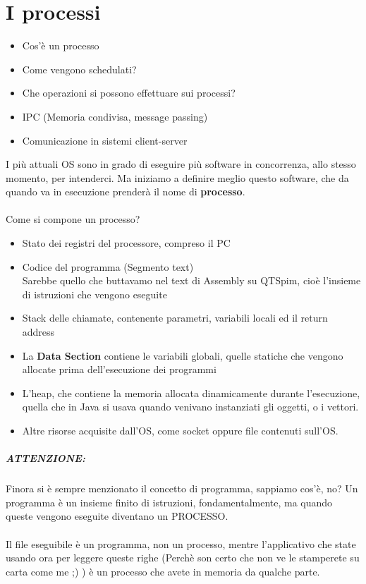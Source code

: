 \documentclass[12pt, a4paper, openany, twoside]{book}
\begin{document}
\chapter{I processi}
\begin{itemize}
	\item Cos'è un processo
	\item Come vengono schedulati?
	\item Che operazioni si possono effettuare sui processi?
	\item IPC (Memoria condivisa, message passing)
	\item Comunicazione in sistemi client-server
\end{itemize}
I più attuali OS sono in grado di eseguire più software in concorrenza, allo 
stesso momento, per intenderci. Ma iniziamo a definire meglio questo software,
che da quando va in esecuzione prenderà il nome di \textbf{processo}.
\\ \\
Come si compone un processo? 
\begin{itemize}
	\item Stato dei registri del processore, compreso il PC
	\item Codice del programma (Segmento text) \\
	Sarebbe quello che buttavamo nel text di Assembly su QTSpim, cioè 
	l'insieme di istruzioni che vengono eseguite
	\item Stack delle chiamate, contenente parametri, variabili locali ed il
	return address
	\item La \textbf{Data Section} contiene le variabili globali, quelle statiche
	che vengono allocate prima dell'esecuzione dei programmi
	\item L'heap, che contiene la memoria allocata dinamicamente durante
	l'esecuzione, quella che in Java si usava quando venivano instanziati gli
	oggetti, o i vettori.\\ 
	\item Altre risorse acquisite dall'OS, come socket oppure file contenuti sull'OS.
\end{itemize}   
\paragraph{ATTENZIONE: }
Finora si è sempre menzionato il concetto di programma, sappiamo cos'è, no? 
Un programma è un insieme finito di istruzioni, fondamentalmente, ma quando
queste vengono eseguite diventano un PROCESSO.\\ \\ Il file eseguibile è un 
programma, non un processo, mentre l'applicativo che state usando ora per
leggere queste righe (Perchè son certo che non ve le stamperete su carta come
me ;) ) è un processo che avete in memoria da qualche parte. 
\\ \\
\end{document}
